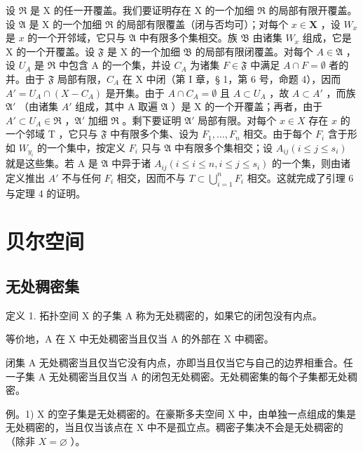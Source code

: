 设 \(\mathfrak{R}\) 是 X 的任一开覆盖。我们要证明存在 X 的一个加细 \(\mathfrak{R}\) 的局部有限开覆盖。设 \(\mathfrak{A}\) 是 X 的一个加细 \(\mathfrak{R}\) 的局部有限覆盖（闭与否均可）；对每个 \(x \in \mathbf{X}\) ，设 \(W_x\) 是 \(x\) 的一个开邻域，它只与 \(\mathfrak{A}\) 中有限多个集相交。族 \(\mathfrak{B}\) 由诸集 \(W_x\) 组成，它是 X 的一个开覆盖。设 \(\mathfrak{F}\) 是 X 的一个加细 \(\mathfrak{B}\) 的局部有限闭覆盖。对每个 \(A \in \mathfrak{A}\) ，设 \(U_A\) 是 \(\mathfrak{R}\) 中包含 A 的一个集，并设 \(C_A\) 为诸集 \(F \in \mathfrak{F}\) 中满足 \(A \cap F = \emptyset\) 者的并。由于 \(\mathfrak{F}\) 局部有限，\(C_A\) 在 X 中闭（第 I 章，§ 1，第 6 号，命题 4），因而 \(A' = U_A \cap (X - C_A)\) 是开集。由于 \(A \cap C_A = \emptyset\) 且 \(A \subset U_A\) ，故 \(A \subset A'\) ，而族 \(\mathfrak{A}'\) （由诸集 \(A'\) 组成，其中 A 取遍 \(\mathfrak{A}\) ）是 X 的一个开覆盖；再者，由于 \(A' \subset U_A \in \mathfrak{R}\) ，\(\mathfrak{A}'\) 加细 \(\mathfrak{R}\) 。剩下要证明 \(\mathfrak{A}'\) 局部有限。对每个 \(x \in X\) 存在 \(x\) 的一个邻域 T ，它只与 \(\mathfrak{F}\) 中有限多个集、设为 \(F_1, \ldots, F_n\) 相交。由于每个 \(F_i\) 含于形如 \(W_{y_i}\) 的一个集中，按定义 \(F_i\) 只与 \(\mathfrak{A}\) 中有限多个集相交；设 \(A_{ij} (i \leqslant j \leqslant s_i)\) 就是这些集。若 A 是 \(\mathfrak{A}\) 中异于诸 \(A_{ij} (i \leqslant i \leqslant n, i \leqslant j \leqslant s_i)\) 的一个集，则由诸定义推出 \(A'\) 不与任何 \(F_i\) 相交，因而不与 \(T \subset \bigcup_{i=1}^{n} F_i\) 相交。这就完成了引理 6 与定理 4 的证明。

\section{贝尔空间}

\subsection{无处稠密集}

定义 1. 拓扑空间 X 的子集 A 称为无处稠密的，如果它的闭包没有内点。

等价地，A 在 X 中无处稠密当且仅当 A 的外部在 X 中稠密。

闭集 A 无处稠密当且仅当它没有内点，亦即当且仅当它与自己的边界相重合。任一子集 A 无处稠密当且仅当 A 的闭包无处稠密。无处稠密集的每个子集都无处稠密。

例。1) X 的空子集是无处稠密的。在豪斯多夫空间 X 中，由单独一点组成的集是无处稠密的，当且仅当该点在 X 中不是孤立点。稠密子集决不会是无处稠密的（除非 \(X = \varnothing\) ）。

